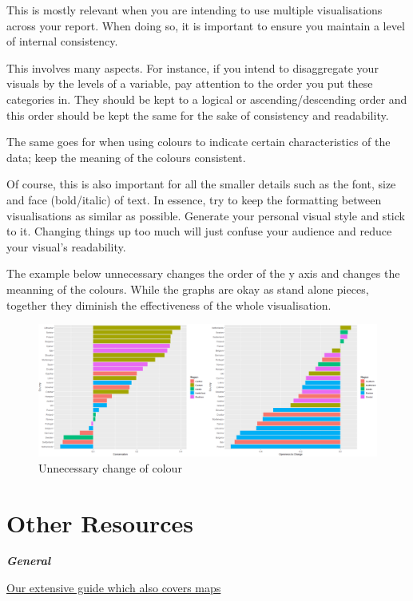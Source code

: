 \documentclass[
]{book}
\begin{document}
This is mostly relevant when you are intending to use multiple visualisations across your report. When doing so, it is important to ensure you maintain a level of internal consistency.

This involves many aspects. For instance, if you intend to disaggregate your visuals by the levels of a variable, pay attention to the order you put these categories in. They should be kept to a logical or ascending/descending order and this order should be kept the same for the sake of consistency and readability.

The same goes for when using colours to indicate certain characteristics of the data; keep the meaning of the colours consistent.

Of course, this is also important for all the smaller details such as the font, size and face (bold/italic) of text. In essence, try to keep the formatting between visualisations as similar as possible. Generate your personal visual style and stick to it. Changing things up too much will just confuse your audience and reduce your visual's readability.

The example below unnecessary changes the order of the y axis and changes the meanning of the colours. While the graphs are okay as stand alone pieces, together they diminish the effectiveness of the whole visualisation.

\begin{figure}
\centering
\includegraphics{img/b2b plots.png}
\caption{Unnecessary change of colour}
\end{figure}

\hypertarget{other-resources}{%
\section{Other Resources}\label{other-resources}}

\textbf{\emph{General}}

\href{}{Our extensive guide which also covers maps}
\end{document}
